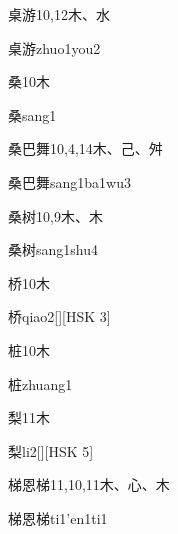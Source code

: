 \begin{entry}{桌游}{10,12}{⽊、⽔}
  \begin{phonetics}{桌游}{zhuo1you2}
  \end{phonetics}
\end{entry}

\begin{entry}{桑}{10}{⽊}
  \begin{phonetics}{桑}{sang1}
  \end{phonetics}
\end{entry}

\begin{entry}{桑巴舞}{10,4,14}{⽊、⼰、⾇}
  \begin{phonetics}{桑巴舞}{sang1ba1wu3}
  \end{phonetics}
\end{entry}

\begin{entry}{桑树}{10,9}{⽊、⽊}
  \begin{phonetics}{桑树}{sang1shu4}
  \end{phonetics}
\end{entry}

\begin{entry}{桥}{10}{⽊}
  \begin{phonetics}{桥}{qiao2}[][HSK 3]
  \end{phonetics}
\end{entry}

\begin{entry}{桩}{10}{⽊}
  \begin{phonetics}{桩}{zhuang1}
  \end{phonetics}
\end{entry}

\begin{entry}{梨}{11}{⽊}
  \begin{phonetics}{梨}{li2}[][HSK 5]
  \end{phonetics}
\end{entry}

\begin{entry}{梯恩梯}{11,10,11}{⽊、⼼、⽊}
  \begin{phonetics}{梯恩梯}{ti1'en1ti1}
  \end{phonetics}
\end{entry}

